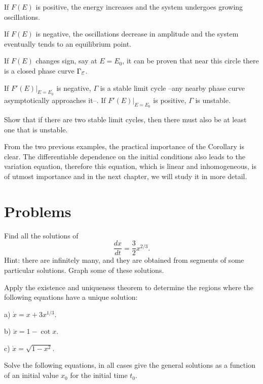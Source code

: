If $F(E)$ is positive, the energy increases and the system undergoes
growing oscillations.

If $F(E)$ is negative, the oscillations decrease in amplitude and the
system eventually tends to an equilibrium point.

If $F(E)$ changes sign, say at $E=E_0$, it can be proven
that near this circle there is a closed phase curve
$\Gamma_{\mbox{$\varepsilon$}}$. 

If $\left.F'(E)\right|_{E=E_0}$ is negative, $\Gamma$ is a stable limit cycle 
--any nearby phase curve asymptotically approaches it--. If $\left.F'(E)\right|_{E=E_0}$ is positive,
$\Gamma$ is unstable.

\bpro Show that if there are two stable limit cycles,
then there must also be at least one that is unstable.
\epro

From the two previous examples, the practical importance
of the Corollary is clear. The differentiable dependence on the
initial conditions also leads to the variation equation,
therefore this equation, which is linear and inhomogeneous, is of utmost
importance and in the next chapter, we will study it in more detail.


\section{Problems}


\bpro[Kiseliov]
Find all the solutions of 
\begin{equation}
  \label{eq:tresmedios}
  \frac{dx}{dt} = \frac{3}{2} x^{2/3}.
\end{equation}
%
Hint: there are infinitely many, and they are obtained from segments of some
particular solutions.
Graph some of these solutions.
\epro

\bpro[Kiseliov]
Apply the existence and uniqueness theorem to determine the regions
where the following equations have a unique solution:

a) $\dot{x} = x + 3 x^{1/3}$.

b) $\dot{x} = 1 - \cot x$.

c) $\dot{x} = \sqrt{1-x^2}$.
\epro

\bpro[Kiseliov]
Solve the following equations, in all cases give the
general solutions as a function of an initial value $x_0$
for the initial time $t_0$.

